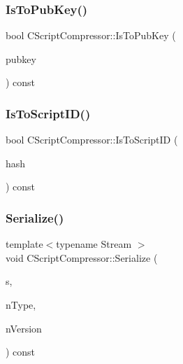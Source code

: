 \subsubsection{\texorpdfstring{Is\+To\+Pub\+Key()}{IsToPubKey()}}
{\footnotesize\ttfamily bool C\+Script\+Compressor\+::\+Is\+To\+Pub\+Key (\begin{DoxyParamCaption}\item[{\mbox{\hyperlink{class_c_pub_key}{C\+Pub\+Key}} \&}]{pubkey }\end{DoxyParamCaption}) const\hspace{0.3cm}{\ttfamily [protected]}}

\mbox{\label{class_c_script_compressor_a7a995d1064299a58d4f2e9f0ac205d07}} 
\subsubsection{\texorpdfstring{Is\+To\+Script\+I\+D()}{IsToScriptID()}}
{\footnotesize\ttfamily bool C\+Script\+Compressor\+::\+Is\+To\+Script\+ID (\begin{DoxyParamCaption}\item[{C\+Script\+ID \&}]{hash }\end{DoxyParamCaption}) const\hspace{0.3cm}{\ttfamily [protected]}}

\mbox{\label{class_c_script_compressor_a5702b644df500ddd11c56d0490e8be44}} 
\subsubsection{\texorpdfstring{Serialize()}{Serialize()}}
{\footnotesize\ttfamily template$<$typename Stream $>$ \\
void C\+Script\+Compressor\+::\+Serialize (\begin{DoxyParamCaption}\item[{Stream \&}]{s,  }\item[{int}]{n\+Type,  }\item[{int}]{n\+Version }\end{DoxyParamCaption}) const\hspace{0.3cm}{\ttfamily [inline]}}

